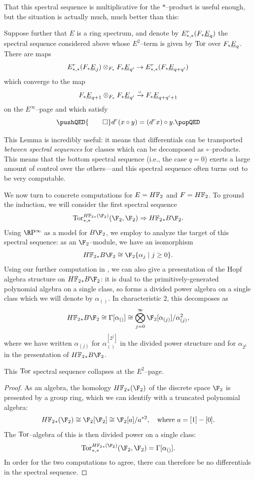 That this spectral sequence is multiplicative for the \(\ast\)--product is useful enough, but the situation is actually much, much better than this:
\begin{lemma}\label{CircProductAndDifferentials}
Suppose further that \(E\) is a ring spectrum, and denote by \(E^r_{*, *}(F_* \OS{E}{q})\) the spectral sequence considered above whose \(E^2\)--term is given by \(\operatorname{Tor}\) over \(F_* \OS{E}{q}\).
There are maps \[E^r_{*, *}(F_* \OS{E}{j}) \otimes_{F_*} F_* \OS{E}{q'} \to E^r_{*, *}(F_* \OS{E}{q+q'})\] which converge to the map \[F_* \OS{E}{q+1} \otimes_{F_*} F_* \OS{E}{q'} \xrightarrow{\circ} F_* \OS{E}{q+q'+1}\] on the \(E^\infty\)--page and which satisfy
\[
\pushQED{\qed}
d^r(x \circ y) = (d^r x) \circ y. \qedhere
\popQED
\]
\end{lemma}
\noindent This Lemma is incredibly useful: it means that differentials can be transported \emph{between spectral sequences} for classes which can be decomposed as \(\circ\)--products.
This means that the bottom spectral sequence (i.e., the case \(q = 0\)) exerts a large amount of control over the others---and this spectral sequence often turns out to be very computable.

We now turn to concrete computations for \(E = \HFtwo\) and \(F = \HFtwo\).
To ground the induction, we will consider the first spectral sequence \[\Tor^{\HFtwo_*(\F_2)}_{*, *}(\F_2, \F_2) \Rightarrow \HFtwo_* B\F_2.\]
Using \(\RP^\infty\) as a model for \(B\F_2\), we employ  to analyze the target of this spectral sequence: as an \(\F_2\)--module, we have an isomorphism \[\HFtwo_* B\F_2 \cong \F_2\{\alpha_j \mid j \ge 0\}.\]
Using our further computation in , we can also give a presentation of the Hopf algebra structure on \(\HFtwo_* B\F_2\): it is dual to the primitively-generated polynomial algebra on a single class, so forms a divided power algebra on a single class which we will denote by \(\alpha_{()}\).
In characteristic \(2\), this decomposes as \[\HFtwo_* B\F_2 \cong \Gamma[\alpha_{()}] \cong \bigotimes_{j=0}^\infty \F_2[\alpha_{(j)}] / \alpha_{(j)}^2,\] where we have written \(\alpha_{(j)}\) for \(\alpha_{()}^{[2^j]}\) in the divided power structure and for \(\alpha_{2^j}\) in the presentation of \(\HFtwo_* B\F_2\).

\begin{corollary}
This \(\operatorname{Tor}\) spectral sequence collapses at the \(E^2\)--page.
\end{corollary}
\begin{proof}
As an algebra, the homology \(\HFtwo_*(\F_2)\) of the discrete space \(\F_2\) is presented by a group ring, which we can identify with a truncated polynomial algebra: \[\HFtwo_*(\F_2) \cong \F_2[\F_2] \cong
\F_2[a] / a^{\ast 2}, \quad \text{where \(a = [1] - [0]\)}.\]
The \(\operatorname{Tor}\)--algebra of this is then divided power on a single class: \[\Tor^{\HFtwo_*(\F_2)}_{*, *}(\F_2, \F_2) = \Gamma[\alpha_{()}].\]
In order for the two computations to agree, there can therefore be no differentials in the spectral sequence.
\end{proof}

